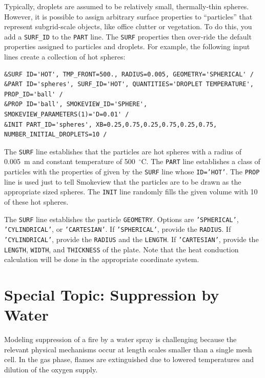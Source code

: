 \documentclass[11pt]{book}
\newcommand{\ct}{\tt\small}
\begin{document}
Typically, droplets are assumed to be relatively small, thermally-thin spheres. However, it is possible to assign arbitrary surface properties to
``particles'' that represent subgrid-scale objects, like office clutter or vegetation. To do this, you add a {\ct SURF\_ID} to the {\ct PART} line. The
{\ct SURF} properties then over-ride the default properties assigned to particles and droplets. For example, the following input lines create a collection
of hot spheres:

\footnotesize
\begin{verbatim}
&SURF ID='HOT', TMP_FRONT=500., RADIUS=0.005, GEOMETRY='SPHERICAL' /
&PART ID='spheres', SURF_ID='HOT', QUANTITIES='DROPLET TEMPERATURE', PROP_ID='ball' /
&PROP ID='ball', SMOKEVIEW_ID='SPHERE', SMOKEVIEW_PARAMETERS(1)='D=0.01' /
&INIT PART_ID='spheres', XB=0.25,0.75,0.25,0.75,0.25,0.75, NUMBER_INITIAL_DROPLETS=10 /
\end{verbatim}
\normalsize

\noindent
The {\ct SURF} line establishes that the particles are hot spheres with a radius of 0.005~m and constant temperature of 500~$^\circ$C. The {\ct PART}
line establishes a class of particles with the properties of given by the {\ct SURF} line whose {\ct ID='HOT'}. The {\ct PROP} line is used just
to tell Smokeview that the particles are to be drawn as the appropriate sized spheres. The {\ct INIT} line randomly fills the given volume with
10 of these hot spheres.

The {\ct SURF} line establishes the particle {\ct GEOMETRY}. Options are {\ct 'SPHERICAL'}, {\ct 'CYLINDRICAL'}, or {\ct 'CARTESIAN'}. If
{\ct 'SPHERICAL'}, provide the {\ct RADIUS}. If {\ct 'CYLINDRICAL'}, provide the {\ct RADIUS} and the {\ct LENGTH}. If {\ct 'CARTESIAN'}, provide
the {\ct LENGTH}, {\ct WIDTH}, and {\ct THICKNESS} of the plate. Note that the heat conduction calculation will be done in the appropriate coordinate
system.





\clearpage

\section{Special Topic: Suppression by Water}
\label{info:suppression}

Modeling suppression of a fire by a water spray is challenging because
the relevant physical mechanisms occur at length scales smaller than a
single mesh cell. In the gas phase, flames are extinguished due to lowered
temperatures and dilution of the oxygen supply.
\end{document}

